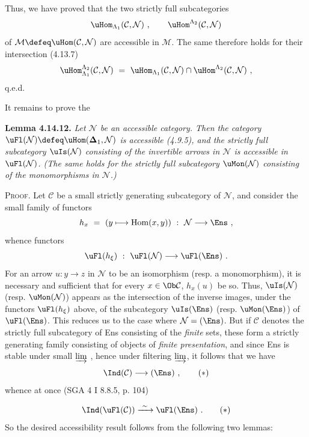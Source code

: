 Thus, we have proved that the two strictly full subcategories
\[
\uHom_{\Lambda_1}(\mathcal{C},\mathcal{N}) \ , \qquad \uHom^{\Lambda_2}(\mathcal{C},\mathcal{N})
\]
of $\mathcal{M} \defeq \uHom(\mathcal{C},\mathcal{N})$ are accessible in $\mathcal{M}$. The same therefore holds for their intersection (4.13.7)
\[
\uHom^{\Lambda_2}_{\Lambda_1}(\mathcal{C},\mathcal{N}) \ = \ \uHom_{\Lambda_1}(\mathcal{C},\mathcal{N}) \cap \uHom^{\Lambda_2}(\mathcal{C},\mathcal{N}) \ ,
\]
q.e.d.

It remains to prove the

\textbf{Lemma 4.14.12.} \textit{Let $\mathcal{N}$ be an accessible category. Then the category $\uFl(\mathcal{N}) \defeq \uHom(\boldsymbol{\Delta}_1,\mathcal{N})$ is accessible (4.9.5), and the strictly full subcategory $\uIs(\mathcal{N})$ consisting of the invertible arrows in $\mathcal{N}$ is accessible in $\uFl(\mathcal{N})$. (The same holds for the strictly full subcategory $\uMon(\mathcal{N})$ consisting of the monomorphisms in $\mathcal{N}$.)}

\textsc{Proof}. Let $\mathcal{C}$ be a small strictly generating subcategory of $\mathcal{N}$, and consider the small family of functors
\[
h_x \ = \ (y \longmapsto \mathrm{Hom}(x,y)) \ : \ \mathcal{N} \longrightarrow \Ens \ ,
\]
whence functors
\[
\uFl(h_\xi) \ : \ \uFl(\mathcal{N}) \longrightarrow \uFl(\Ens) \ . %
\]
For an arrow $u : y \longrightarrow z$ in $\mathcal{N}$ to be an isomorphism (resp. a monomorphism), it is necessary and sufficient that for every $x \in \Ob\mathcal{C}$, $h_x(u)$ be so. Thus, $\uIs(\mathcal{N})$ (resp. $\uMon(\mathcal{N})$) appears as the intersection of the inverse images, under the functors $\uFl(h_\xi)$ above, of the subcategory $\uIs(\Ens)$ (resp. $\uMon(\Ens)$) of $\uFl(\Ens)$. This reduces us to the case where $\mathcal{N} = (\Ens)$. But if $\mathcal{C}$ denotes the strictly full subcategory of Ens consisting of the \textit{finite} sets, these form a strictly generating family consisting of objects of \textit{finite presentation}, and since Ens is stable under small $\varinjlim$ , hence under filtering $\varinjlim$, it follows that we have %
\[
\Ind(\mathcal{C}) \longrightarrow (\Ens) \ , \tag*{$(*)$}
\]
whence at once (SGA 4 I 8.8.5, p. 104)

\[
\Ind(\uFl(\mathcal{C})) \xrightarrow{\ \sim\ } \uFl(\Ens) \ . \tag*{$(*)$}
\]
So the desired accessibility result follows from the following two lemmas:


